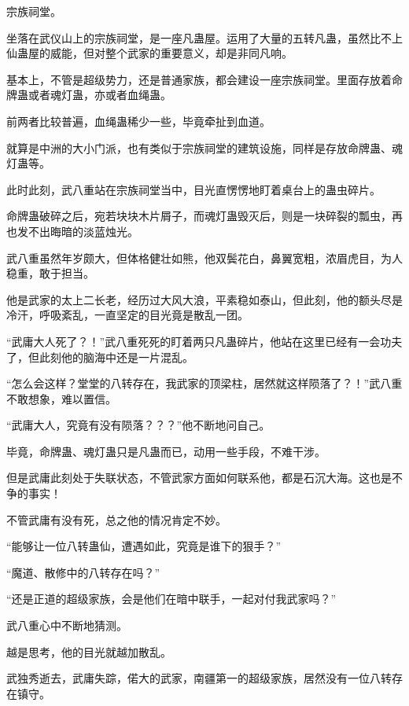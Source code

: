 
\begin{this_body}



宗族祠堂。

坐落在武仪山上的宗族祠堂，是一座凡蛊屋。运用了大量的五转凡蛊，虽然比不上仙蛊屋的威能，但对整个武家的重要意义，却是非同凡响。

基本上，不管是超级势力，还是普通家族，都会建设一座宗族祠堂。里面存放着命牌蛊或者魂灯蛊，亦或者血绳蛊。

前两者比较普遍，血绳蛊稀少一些，毕竟牵扯到血道。

就算是中洲的大小门派，也有类似于宗族祠堂的建筑设施，同样是存放命牌蛊、魂灯蛊等。

此时此刻，武八重站在宗族祠堂当中，目光直愣愣地盯着桌台上的蛊虫碎片。

命牌蛊破碎之后，宛若块块木片屑子，而魂灯蛊毁灭后，则是一块碎裂的瓢虫，再也发不出晦暗的淡蓝烛光。

武八重虽然年岁颇大，但体格健壮如熊，他双鬓花白，鼻翼宽粗，浓眉虎目，为人稳重，敢于担当。

他是武家的太上二长老，经历过大风大浪，平素稳如泰山，但此刻，他的额头尽是冷汗，呼吸紊乱，一直坚定的目光竟是散乱一团。

“武庸大人死了？！”武八重死死的盯着两只凡蛊碎片，他站在这里已经有一会功夫了，但此刻他的脑海中还是一片混乱。

“怎么会这样？堂堂的八转存在，我武家的顶梁柱，居然就这样陨落了？！”武八重不敢想象，难以置信。

“武庸大人，究竟有没有陨落？？？”他不断地问自己。

毕竟，命牌蛊、魂灯蛊只是凡蛊而已，动用一些手段，不难干涉。

但是武庸此刻处于失联状态，不管武家方面如何联系他，都是石沉大海。这也是不争的事实！

不管武庸有没有死，总之他的情况肯定不妙。

“能够让一位八转蛊仙，遭遇如此，究竟是谁下的狠手？”

“魔道、散修中的八转存在吗？”

“还是正道的超级家族，会是他们在暗中联手，一起对付我武家吗？”

武八重心中不断地猜测。

越是思考，他的目光就越加散乱。

武独秀逝去，武庸失踪，偌大的武家，南疆第一的超级家族，居然没有一位八转存在镇守。


\end{this_body}
